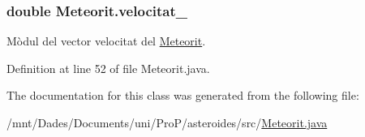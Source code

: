 \hypertarget{class_meteorit_a6d567bfb1f4d118c6c36c7bff76ec28a}{}
\subsubsection[{velocitat\+\_\+}]{\setlength{\rightskip}{0pt plus 5cm}double Meteorit.\+velocitat\+\_\+\hspace{0.3cm}{\ttfamily [private]}}\label{class_meteorit_a6d567bfb1f4d118c6c36c7bff76ec28a}


Mòdul del vector velocitat del \hyperlink{class_meteorit}{Meteorit}. 



Definition at line 52 of file Meteorit.\+java.



The documentation for this class was generated from the following file\+:\begin{DoxyCompactItemize}
\item 
/mnt/\+Dades/\+Documents/uni/\+Pro\+P/asteroides/src/\hyperlink{_meteorit_8java}{Meteorit.\+java}\end{DoxyCompactItemize}
